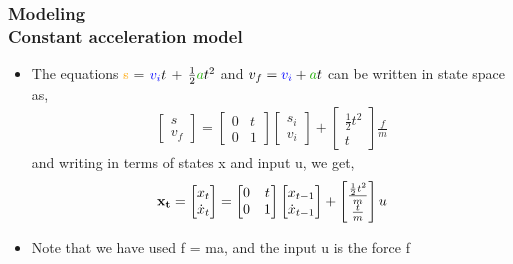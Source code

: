 \documentclass[hyperref={pdfpagelabels=true}]{beamer}
\begin{document}
\begin{frame}
\frametitle{Modeling\\ {\large Constant acceleration model}} 
\begin{itemize}
\item The equations \textcolor{orange}{s} = $\textcolor{blue}{v_i}t$ + $\frac{1}{2}\textcolor{mygreen}{a}t^2$ and $v_f = \textcolor{blue}{v_i} + \textcolor{mygreen}{a}t$ can be written in state space as,
\begin{align*}
\begin{bmatrix}
s \\ v_f
\end{bmatrix} = \begin{bmatrix}
0 & t \\ 0 & 1
\end{bmatrix} \begin{bmatrix}
s_i \\ v_i
\end{bmatrix}+\begin{bmatrix}
\frac{1}{2}t^2 \\ t
\end{bmatrix}
\frac{f}{m}
\end{align*}
and writing in terms of states x and input u, we get, 
\begin{align*}
{\bf x_t} = \begin{bmatrix}
x_t \\ \dot{x}_t
\end{bmatrix}= \begin{bmatrix}
0 & t \\ 0 & 1
\end{bmatrix}
\begin{bmatrix}
x_{t-1} \\ \dot{x}_{t-1}
\end{bmatrix} + \begin{bmatrix}
\frac{\frac{1}{2}t^2}{m} \\ \frac{t}{m}
\end{bmatrix}u
\end{align*}
\item Note that we have used f = m\textcolor{mygreen}{a}, and the input u is the force f
\end{itemize}
\end{frame}
\end{document}
